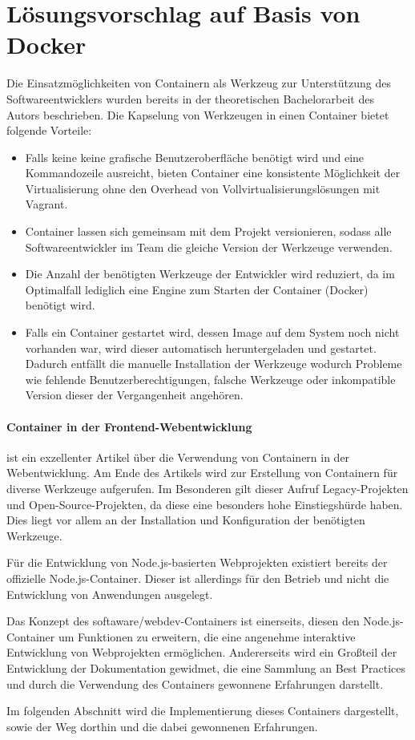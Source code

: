 \chapter{Lösungsvorschlag auf Basis von Docker}
\label{cha:concept}
Die Einsatzmöglichkeiten von Containern als Werkzeug zur Unterstützung des Softwareentwicklers wurden bereits in der theoretischen Bachelorarbeit des Autors beschrieben.
Die Kapselung von Werkzeugen in einen Container bietet folgende Vorteile:

\begin{itemize}
    \item Falls keine keine grafische Benutzeroberfläche benötigt wird und eine Kommandozeile ausreicht, bieten Container eine konsistente Möglichkeit der Virtualisierung ohne den Overhead von Vollvirtualisierungslösungen mit Vagrant.
    \item Container lassen sich gemeinsam mit dem Projekt versionieren, sodass alle Softwareentwickler im Team die gleiche Version der Werkzeuge verwenden.
    \item Die Anzahl der benötigten Werkzeuge der Entwickler wird reduziert, da im Optimalfall lediglich eine Engine zum Starten der Container (\zB Docker) benötigt wird.
    \item Falls ein Container gestartet wird, dessen Image auf dem System noch nicht vorhanden war, wird dieser automatisch heruntergeladen und gestartet.
        Dadurch entfällt die manuelle Installation der Werkzeuge wodurch Probleme wie fehlende Benutzerberechtigungen, falsche Werkzeuge oder inkompatible Version dieser der Vergangenheit angehören.
\end{itemize}

\subsubsection{Container in der Frontend-Webentwicklung}
\autocite{Demmel.webdev-environment:online} ist ein exzellenter Artikel über die Verwendung von Containern in der Webentwicklung.
Am Ende des Artikels wird zur Erstellung von Containern für diverse Werkzeuge aufgerufen.
Im Besonderen gilt dieser Aufruf Legacy-Projekten und Open-Source-Projekten, da diese eine besonders hohe Einstiegshürde haben.
Dies liegt vor allem an der Installation und Konfiguration der benötigten Werkzeuge.


Für die Entwicklung von Node.js-basierten Webprojekten existiert bereits der offizielle Node.js-Container.
Dieser ist allerdings für den Betrieb und nicht die Entwicklung von Anwendungen ausgelegt.

Das Konzept des softaware/webdev-Containers ist einerseits, diesen den Node.js-Container um Funktionen zu erweitern, die eine angenehme interaktive Entwicklung von Webprojekten ermöglichen.
Andererseits wird ein Großteil der Entwicklung der Dokumentation gewidmet, die eine Sammlung an Best Practices und durch die Verwendung des Containers gewonnene Erfahrungen darstellt.

Im folgenden Abschnitt wird die Implementierung dieses Containers dargestellt, sowie der Weg dorthin und die dabei gewonnenen Erfahrungen.
